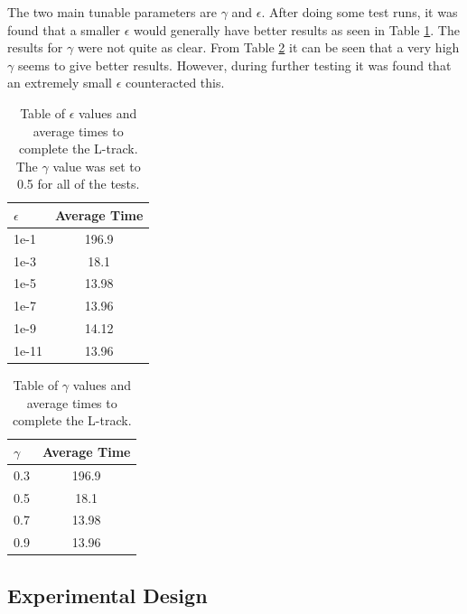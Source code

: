 \documentclass{article}
\begin{document}
	The two main tunable parameters are $\gamma$ and $\epsilon$. After doing some test runs, it was found that a smaller $\epsilon$ would generally have better results as seen in Table \ref{epsilon}. The results for $\gamma$ were not quite as clear. From Table \ref{gamma} it can be seen that a very high $\gamma$ seems to give better results. However, during further testing it was found that an extremely small $\epsilon$ counteracted this.
	\begin{table}
		\centering
		\begin{tabular}{|l|c|}
			\hline
			$\epsilon$ & Average Time \\ \hline
			1e-1 & 196.9 \\ 
			1e-3 & 18.1 \\
			1e-5 & 13.98\\
			1e-7 & 13.96 \\
			1e-9 & 14.12 \\ 
			1e-11 & 13.96 \\ \hline
		\end{tabular}
		\caption{Table of $\epsilon$ values and average times to complete the L-track. \\ The $\gamma$ value was set to 0.5 for all of the tests.}
		\label{epsilon}
	\end{table}
	
	\begin{table}
		\centering
		\begin{tabular}{|l|c|}
			\hline
			$\gamma$ & Average Time \\ \hline
			0.3 & 196.9 \\ 
			0.5 & 18.1 \\
			0.7 & 13.98\\
			0.9 & 13.96 \\ \hline
		\end{tabular}
		\caption{Table of $\gamma$ values and average times to complete the L-track.}
		\label{gamma}
	\end{table}
	\subsection{Experimental Design}
	
\end{document}
